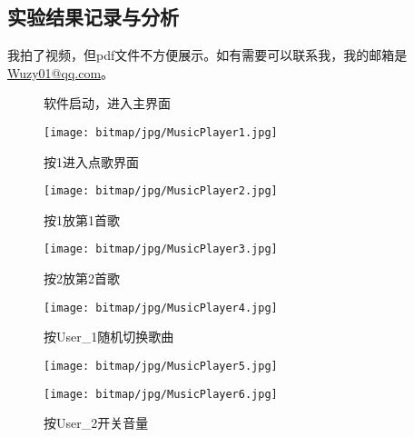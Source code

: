 \subsection{实验结果记录与分析}
我拍了视频，但pdf文件不方便展示。如有需要可以联系我，我的邮箱是\href{mailto：Wuzy01@qq.com}{Wuzy01@qq.com}。
\begin{figure}[htbp]
	\centering
	\begin{minipage}[htbp]{7.5cm}
		\centering
		\caption{软件启动，进入主界面}
		\label{MusicPlayer1}
		\texttt{[image: bitmap/jpg/MusicPlayer1.jpg]}
	\end{minipage}
	\begin{minipage}[htbp]{7.5cm}
		\centering
		\caption{按1进入点歌界面}
		\label{MusicPlayer2}
		\texttt{[image: bitmap/jpg/MusicPlayer2.jpg]}
	\end{minipage}
	\begin{minipage}[htbp]{7.5cm}
		\centering
		\caption{按1放第1首歌}
		\label{MusicPlayer3}
		\texttt{[image: bitmap/jpg/MusicPlayer3.jpg]}
	\end{minipage}
	\begin{minipage}[htbp]{7.5cm}
		\centering
		\caption{按2放第2首歌}
		\label{MusicPlayer4}
		\texttt{[image: bitmap/jpg/MusicPlayer4.jpg]}
	\end{minipage}
	\begin{minipage}[htbp]{7.5cm}
		\centering
		\caption{按User\_1随机切换歌曲}
		\label{MusicPlayer5}
		\texttt{[image: bitmap/jpg/MusicPlayer5.jpg]}
	\end{minipage}
	\begin{minipage}[htbp]{7.5cm}
		\centering
		\caption{按User\_2开关音量}
		\label{MusicPlayer6}
		\texttt{[image: bitmap/jpg/MusicPlayer6.jpg]}
	\end{minipage}
\end{figure}
